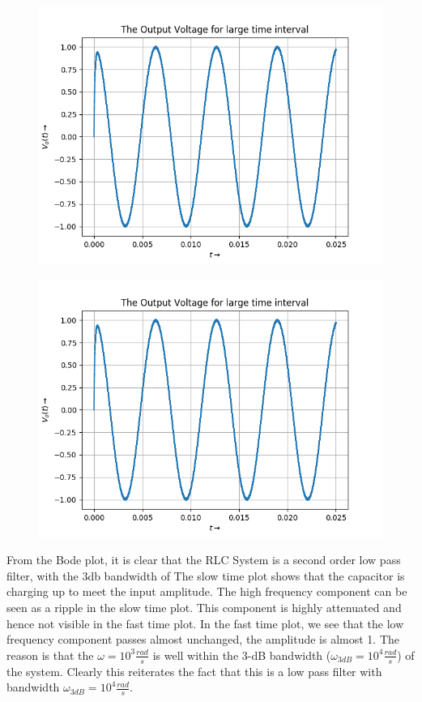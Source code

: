 \documentclass[11pt, a4paper]{article}
\begin{document}
\begin{figure}[!tbh]
   	\centering
   	\includegraphics[scale=0.5]{Figure_6.png}
   	\label{fig:32}
   \end{figure}
\begin{figure}[!tbh]
   	\centering
   	\includegraphics[scale=0.5]{Figure_6.png}
   	\label{fig:32}
   \end{figure}
{
From the Bode plot, it is clear that the RLC System is a second order low pass filter, with the 3db bandwidth of 
The slow time plot shows that the capacitor is charging up to meet the input amplitude. The high frequency component can be seen as a ripple in the slow time plot.  This component is highly attenuated and hence not visible in the fast time plot.
In the fast time plot, we see that the low frequency component passes almost unchanged, the amplitude is almost 1.
The reason is that the $\omega = 10^3\frac{rad}{s}$ is well within the 3-dB bandwidth ($\omega_{3dB} = 10^4\frac{rad}{s}$) of the system.
Clearly this reiterates the fact that this is a low pass filter with bandwidth $\omega_{3dB} = 10^4\frac{rad}{s}$.

}
\end{document}
